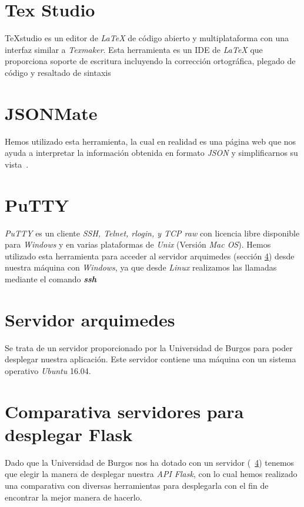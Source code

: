 \section{Tex Studio}
TeXstudio es un editor de \textit{LaTeX} de código abierto y multiplataforma con una interfaz similar a \textit{Texmaker}. Esta herramienta es un IDE de \textit{LaTeX} que proporciona soporte de escritura incluyendo la corrección ortográfica, plegado de código y resaltado de sintaxis~\cite{wiki:texstudio}


\section{JSONMate}
Hemos utilizado esta herramienta, la cual en realidad es una página web que nos ayuda a interpretar la información obtenida en formato \textit{JSON} y simplificarnos su vista~\cite{json:jsnomate}.

\section{PuTTY}
\textit{PuTTY} es un cliente \textit{SSH, Telnet, rlogin, y TCP raw} con licencia libre disponible para \textit{Windows} y en varias plataformas de \textit{Unix} (Versión \textit{Mac OS}). Hemos utilizado esta herramienta para acceder al servidor arquimedes (sección \ref{sec:arquimedes}) desde nuestra máquina con \textit{Windows}, ya que desde \textit{Linux} realizamos las llamadas mediante el comando \textit{\textbf{ssh}}~\cite{wiki:putty}

\section{Servidor arquimedes}\label{sec:arquimedes}
Se trata de un servidor proporcionado por la Universidad de Burgos para poder desplegar nuestra aplicación. Este servidor contiene una máquina con un sistema operativo \textit{Ubuntu} 16.04.

\section{Comparativa servidores para desplegar Flask}
Dado que la Universidad de Burgos nos ha dotado con un servidor (~\ref{sec:arquimedes}) tenemos que elegir la manera de desplegar nuestra \textit{API Flask}, con lo cual hemos realizado una comparativa con diversas herramientas para desplegarla con el fin de encontrar la mejor manera de hacerlo.

